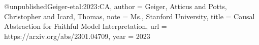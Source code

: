 @unpublished{Geiger-etal:2023:CA,
	author = {Geiger, Atticus and Potts, Christopher and Icard, Thomas},
	note = {Ms., Stanford University},
	title = {Causal Abstraction for Faithful Model Interpretation},
	url = {https://arxiv.org/abs/2301.04709},
	year = {2023}}
